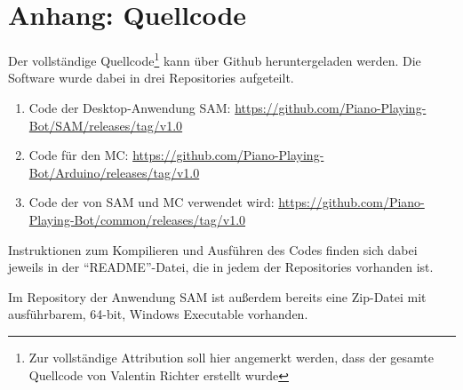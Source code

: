 \chapter{Anhang: Quellcode} \label{appndix-code}

Der vollständige Quellcode\footnote{Zur vollständige Attribution soll hier angemerkt werden, dass der gesamte Quellcode von Valentin Richter erstellt wurde} kann über Github heruntergeladen werden.
Die Software wurde dabei in drei Repositories aufgeteilt.

\begin{enumerate}
	\item Code der Desktop-Anwendung \ac{SAM}: \url{https://github.com/Piano-Playing-Bot/SAM/releases/tag/v1.0}
	\item Code für den \ac{MC}: \url{https://github.com/Piano-Playing-Bot/Arduino/releases/tag/v1.0}
	\item Code der von \ac{SAM} und \ac{MC} verwendet wird: \url{https://github.com/Piano-Playing-Bot/common/releases/tag/v1.0}
\end{enumerate}

Instruktionen zum Kompilieren und Ausführen des Codes finden sich dabei jeweils in der \enquote{README}-Datei, die in jedem der Repositories vorhanden ist.

Im Repository der Anwendung \ac{SAM} ist außerdem bereits eine Zip-Datei mit ausführbarem, 64-bit, Windows Executable vorhanden.
